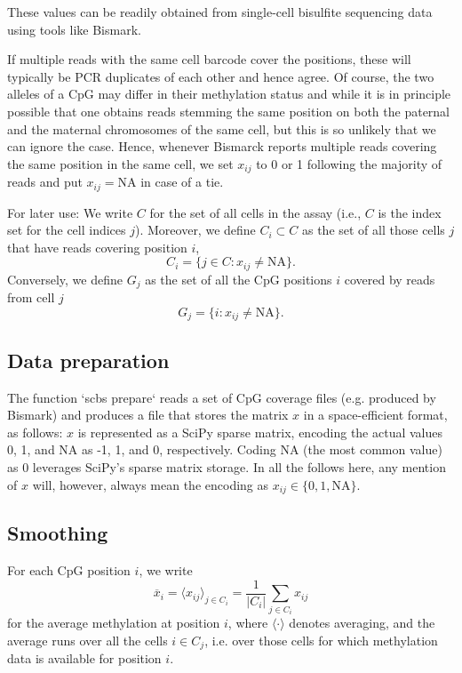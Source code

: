 \documentclass[twocolumn,10pt]{article}
\begin{document}
These values can be readily obtained from single-cell bisulfite sequencing data using tools like Bismark.

If multiple reads with the same cell barcode cover the positions, these will typically be PCR duplicates of each other and hence agree. Of course, the two alleles of a CpG may differ in their methylation status and while it is in principle possible that one obtains reads stemming the same position on both the paternal and the maternal chromosomes of the same cell, but this is so unlikely that we can ignore the case. Hence, whenever Bismarck reports multiple reads covering the same position in the same cell, we set $x_{ij}$ to 0 or 1 following the majority of reads and put $x_{ij}=\text{NA}$ in case of a tie. 

For later use: We write $C$ for the set of all cells in the assay (i.e., $C$ is the index set for the cell indices $j$). Moreover,
we define $C_i\subset C$ as the set of all those cells $j$ that have reads covering position $i$,
$$ C_i=\{j\in C: x_{ij}\neq\text{NA}\}.$$
Conversely, we define $G_j$ as the set of all the CpG positions $i$ covered by reads from cell $j$ 
$$ G_j=\{i: x_{ij}\neq\text{NA}\}.$$

\subsection{Data preparation}

The function `scbs prepare` reads a set of CpG coverage files (e.g. produced by Bismark) and produces a file that stores the matrix $x$ in a space-efficient format, as follows: $x$ is represented as a SciPy sparse matrix, encoding the actual values 0, 1, and NA as -1, 1, and 0, respectively. Coding NA (the most common value) as 0 leverages SciPy's sparse matrix storage. In all the follows here, any mention of $x$ will, however, always mean the encoding as $x_{ij}\in\{0,1,\text{NA}\}$.

\subsection{Smoothing}

For each CpG position $i$, we write 
$$\overline{x}_i=\langle x_{ij} \rangle_{j\in C_i} = \frac{1}{|C_i|}\sum_{j\in C_i} x_{ij}$$ 
for the average methylation at position $i$, where $\langle\cdot\rangle$ denotes averaging, and the average runs over all the cells $i\in C_j$, i.e. over those cells for which methylation data is available for position $i$.
\end{document}
